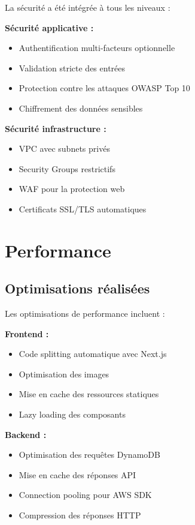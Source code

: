 La sécurité a été intégrée à tous les niveaux :

\textbf{Sécurité applicative :}
\begin{itemize}
    \item Authentification multi-facteurs optionnelle
    \item Validation stricte des entrées
    \item Protection contre les attaques OWASP Top 10
    \item Chiffrement des données sensibles
\end{itemize}

\textbf{Sécurité infrastructure :}
\begin{itemize}
    \item VPC avec subnets privés
    \item Security Groups restrictifs
    \item WAF pour la protection web
    \item Certificats SSL/TLS automatiques
\end{itemize}

\section{Performance}

\subsection{Optimisations réalisées}

Les optimisations de performance incluent :

\textbf{Frontend :}
\begin{itemize}
    \item Code splitting automatique avec Next.js
    \item Optimisation des images
    \item Mise en cache des ressources statiques
    \item Lazy loading des composants
\end{itemize}

\textbf{Backend :}
\begin{itemize}
    \item Optimisation des requêtes DynamoDB
    \item Mise en cache des réponses API
    \item Connection pooling pour AWS SDK
    \item Compression des réponses HTTP
\end{itemize}

